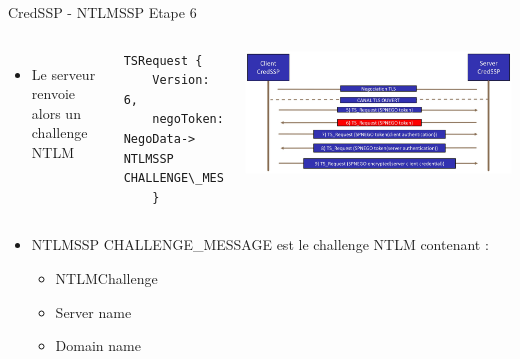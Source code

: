 \documentclass{beamer}
\begin{document}
\begin{frame}[fragile]{CredSSP - NTLMSSP Etape 6}
	 \begin{columns}[T]
	 	\begin{itemize}
	 	\item Le serveur renvoie alors un challenge NTLM
	 	\end{itemize}
	 \begin{lstlisting}[frame=single,basicstyle=\tiny]
TSRequest {
	Version:     6,
	negoToken:   NegoData-> NTLMSSP CHALLENGE\_MESSAGE
	}
	\end{lstlisting}
	 \includegraphics[scale=0.055]{step6.jpg}
	 \end{columns}
	 
	 \begin{itemize}
	 	\item NTLMSSP CHALLENGE\_MESSAGE est le challenge NTLM contenant :
	 		\begin{itemize}
	 		\item NTLMChallenge
	 		\item Server name
	 		\item Domain name
	 		\end{itemize}
	 	\end{itemize}
\end{frame}
\end{document}
